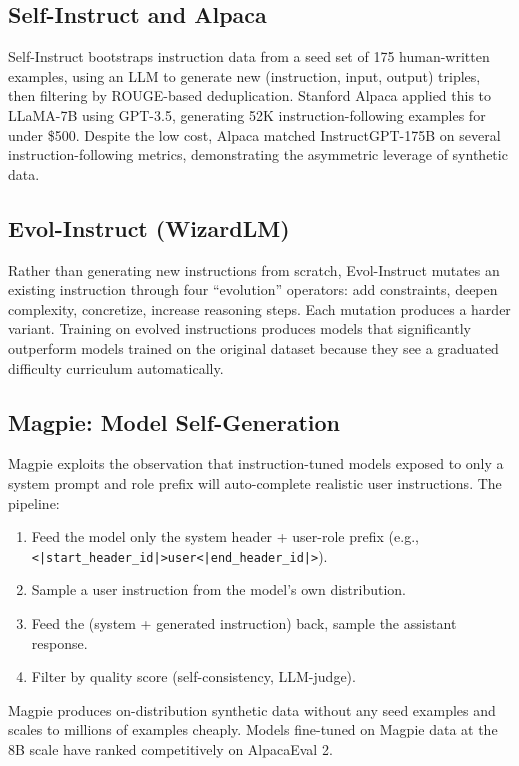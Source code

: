\subsection{Self-Instruct and Alpaca}

Self-Instruct \parencite{wang2022selfinstructaligning} bootstraps instruction data from a seed set of 175 human-written examples, using an LLM to generate new (instruction, input, output) triples, then filtering by ROUGE-based deduplication. Stanford Alpaca \parencite{taori2023alpaca} applied this to LLaMA-7B using GPT-3.5, generating 52K instruction-following examples for under \$500. Despite the low cost, Alpaca matched InstructGPT-175B on several instruction-following metrics, demonstrating the asymmetric leverage of synthetic data.

\subsection{Evol-Instruct (WizardLM)}

Rather than generating new instructions from scratch, Evol-Instruct \parencite{xu2023wizardlm} mutates an existing instruction through four ``evolution'' operators: add constraints, deepen complexity, concretize, increase reasoning steps. Each mutation produces a harder variant. Training on evolved instructions produces models that significantly outperform models trained on the original dataset because they see a graduated difficulty curriculum automatically.

\subsection{Magpie: Model Self-Generation}

Magpie \parencite{xu2024magpie} exploits the observation that instruction-tuned models exposed to only a system prompt and role prefix will auto-complete realistic user instructions. The pipeline:
\begin{enumerate}
  \item Feed the model only the system header + user-role prefix (e.g., \texttt{<|start\_header\_id|>user<|end\_header\_id|>}).
  \item Sample a user instruction from the model's own distribution.
  \item Feed the (system + generated instruction) back, sample the assistant response.
  \item Filter by quality score (self-consistency, LLM-judge).
\end{enumerate}
Magpie produces on-distribution synthetic data without any seed examples and scales to millions of examples cheaply. Models fine-tuned on Magpie data at the 8B scale have ranked competitively on AlpacaEval 2.

